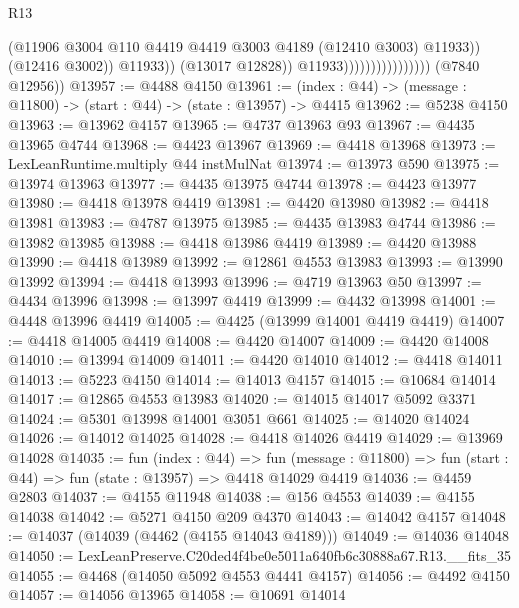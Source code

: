 \begin{lexlean}{R13}
\begin{coremodule}
                                                (@11906
                                                  @3004
                                                  @110
                                                  @4419
                                                  @4419
                                                  @3003
                                                  @4189
                                                  (@12410 @3003)
                                                  @11933))
                                              (@12416 @3002))
                                            @11933))
                                        (@13017 @12828))
                                      @11933))))))))))))))))
      (@7840 @12956))
@13957 := @4488 @4150
@13961 := (index : @44) -> (message : @11800) -> (start : @44) -> (state : @13957) -> @4415
@13962 := @5238 @4150
@13963 := @13962 @4157
@13965 := @4737 @13963 @93
@13967 := @4435 @13965 @4744
@13968 := @4423 @13967
@13969 := @4418 @13968
@13973 := LexLeanRuntime.multiply @44 instMulNat
@13974 := @13973 @590
@13975 := @13974 @13963
@13977 := @4435 @13975 @4744
@13978 := @4423 @13977
@13980 := @4418 @13978 @4419
@13981 := @4420 @13980
@13982 := @4418 @13981
@13983 := @4787 @13975
@13985 := @4435 @13983 @4744
@13986 := @13982 @13985
@13988 := @4418 @13986 @4419
@13989 := @4420 @13988
@13990 := @4418 @13989
@13992 := @12861 @4553 @13983
@13993 := @13990 @13992
@13994 := @4418 @13993
@13996 := @4719 @13963 @50
@13997 := @4434 @13996
@13998 := @13997 @4419
@13999 := @4432 @13998
@14001 := @4448 @13996 @4419
@14005 := @4425 (@13999 @14001 @4419 @4419)
@14007 := @4418 @14005 @4419
@14008 := @4420 @14007
@14009 := @4420 @14008
@14010 := @13994 @14009
@14011 := @4420 @14010
@14012 := @4418 @14011
@14013 := @5223 @4150
@14014 := @14013 @4157
@14015 := @10684 @14014
@14017 := @12865 @4553 @13983
@14020 := @14015 @14017 @5092 @3371
@14024 := @5301 @13998 @14001 @3051 @661
@14025 := @14020 @14024
@14026 := @14012 @14025
@14028 := @4418 @14026 @4419
@14029 := @13969 @14028
@14035 := fun (index : @44) =>
  fun (message : @11800) => fun (start : @44) => fun (state : @13957) => @4418 @14029 @4419
@14036 := @4459 @2803
@14037 := @4155 @11948
@14038 := @156 @4553
@14039 := @4155 @14038
@14042 := @5271 @4150 @209 @4370
@14043 := @14042 @4157
@14048 := @14037 (@14039 (@4462 (@4155 @14043 @4189)))
@14049 := @14036 @14048
@14050 := LexLeanPreserve.C20ded4f4be0e5011a640fb6c30888a67.R13.__fits_35
@14055 := @4468 (@14050 @5092 @4553 @4441 @4157)
@14056 := @4492 @4150
@14057 := @14056 @13965
@14058 := @10691 @14014

\end{coremodule}
\end{lexlean}
